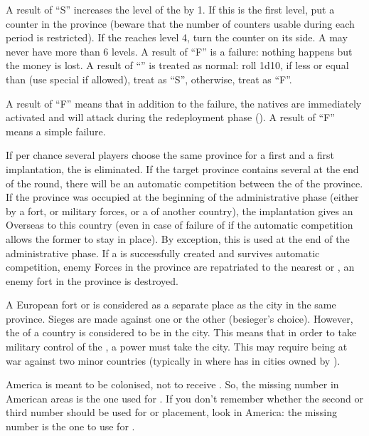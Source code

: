 \bparag A result of ``S'' increases the level of the \TP by 1. If this is the
first level, put a counter in the province (beware that the number of counters
usable during each period is restricted). If the \TP reaches level 4, turn the
counter on its \Faceplus side. A \TP may never have more than 6 levels.
\bparag A result of ``F'' is a failure: nothing happens but the money is lost.
\bparag A result of ``\undemi'' is treated as normal: roll 1d10, if less or
equal than \FTI (use special \FTI if allowed), treat as ``S'', otherwise,
treat as ``F''.

\label{chExpenses:TP:Critical failure} A result of
``F\textetoile'' means that in addition to the failure, the natives are
immediately activated and will attack during the redeployment phase
(). A result of ``F'' means a simple failure.

\bparag If per chance several players choose the same province for a first
\COL and a first \TP implantation, the \TP is eliminated.
\bparag If the target province contains several \TP at the end of the round,
there will be an automatic competition between the \TP of the province.
\bparag If the province was occupied at the beginning of the administrative
phase (either by a fort, or military forces, or a \TP of another country), the
implantation gives an Overseas \CB to this country (even in case of failure of
if the automatic competition allows the former \TP to stay in place). By
exception, this \CB is used at the end of the administrative phase.
\bparag If a \TP is successfully created and survives automatic competition,
enemy Forces in the province are repatriated to the nearest \TP or \COL, an
enemy fort in the province is destroyed.

 A European fort or \TP is considered
as a separate place as the city in the same province. Sieges are made against
one or the other (besieger's choice).
\bparag However, the \TP of a \ROTW country is considered to be in the
city. This means that in order to take military control of the \TP, a power
must take the city. This may require being at war against two minor countries
(typically in  where \paysGujerat has \TP in cities owned by
\paysVijayanagar).

\begin{playtip}
  America is meant to be colonised, not to receive \TP. So, the missing number
  in American areas is the one used for \TP. If you don't remember whether the
  second or third number should be used for \COL or \TP placement, look in
  America: the missing number is the one to use for \TP.
\end{playtip}



